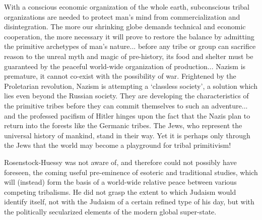\begin{quotex}
With a conscious economic organization of the whole earth, subconscious tribal organizations are needed to protect man's mind from commercialization and disintegration. The more our shrinking globe demands technical and economic cooperation, the more necessary it will prove to restore the balance by admitting the primitive archetypes of man's nature... before any tribe or group can sacrifice reason to the unreal myth and magic of pre-history, its food and shelter must be guaranteed by the peaceful world-wide organization of production... Nazism is premature, it cannot co-exist with the possibility of war. Frightened by the Proletarian revolution, Nazism is attempting a `classless society', a solution which lies even beyond the Russian society. They are developing the characteristics of the primitive tribes before they can commit themselves to such an adventure... and the professed pacifism of Hitler hinges upon the fact that the Nazis plan to return into the forests like the Germanic tribes. The Jews, who represent the universal history of mankind, stand in their way. Yet it is perhaps only through the Jews that the world may become a playground for tribal primitivism!
\end{quotex}

Rosenstock-Huessy was not aware of, and therefore could not possibly have foreseen, the coming useful pre-eminence of esoteric and traditional studies, which will (instead) form the basis of a world-wide relative peace between various competing tribalisms. He did not grasp the extent to which Judaism would identify itself, not with the Judaism of a certain refined type of his day, but with the politically secularized elements of the modern global super-state.

